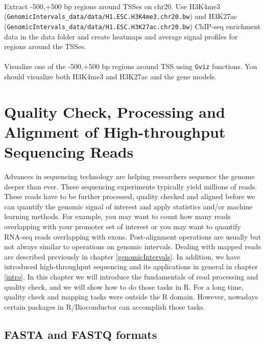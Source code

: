 \documentclass[12pt,]{krantz}
\begin{document}
\hypertarget{section-20}{%
\subsubsection{}\label{section-20}}

Extract -500,+500 bp regions around TSSes on chr20. Use H3K4me3 (\texttt{GenomicIntervals\_data/data/H1.ESC.H3K4me3.chr20.bw}) and H3K27ac (\texttt{GenomicIntervals\_data/data/H1.ESC.H3K27ac.chr20.bw}) ChIP-seq enrichment data in the data folder and create heatmaps and average signal profiles for regions around the TSSes.

\hypertarget{section-21}{%
\subsubsection{}\label{section-21}}

Visualize one of the -500,+500 bp regions around TSS using \texttt{Gviz} functions. You should visualize both H3K4me3 and H3K27ac and the gene models.

\hypertarget{processingReads}{%
\chapter{Quality Check, Processing and Alignment of High-throughput Sequencing Reads}\label{processingReads}}

Advances in sequencing technology are helping researchers sequence the genome deeper than ever. These sequencing experiments typically yield millions of reads. These reads have to be further processed, quality checked and aligned before we can quantify the genomic signal of interest and apply statistics and/or machine learning methods. For example, you may want to count how many reads overlapping with your promoter set of interest or you may want to quantify RNA-seq reads overlapping with exons. Post-alignment operations are usually but not always similar to operations on genomic intervals. Dealing with mapped reads are described previously in chapter \ref{genomicIntervals}. In addition, we have introduced high-throughput sequencing and its applications in general in chapter \ref{intro}. In this chapter we will introduce the fundamentals of read processing and quality check, and we will show how to do those tasks in R. For a long time, quality check and mapping tasks were outside the R domain. However, nowadays certain packages in R/Bioconductor can accomplish those tasks.

\hypertarget{fasta-and-fastq-formats}{%
\section{FASTA and FASTQ formats}\label{fasta-and-fastq-formats}}
\end{document}
